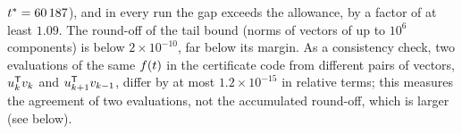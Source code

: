 $t^{*}=60\,187$), and in every run the gap exceeds the allowance, by a factor of at least $1.09$. The round-off of the
tail bound (norms of vectors of up to $10^{6}$ components) is below $2\times10^{-10}$, far below its margin. As a
consistency check, two evaluations of the same $f(t)$ in the certificate code from different pairs of vectors,
$u_k^{\mathsf{T}}v_k$ and $u_{k+1}^{\mathsf{T}}v_{k-1}$, differ by at most $1.2\times10^{-15}$ in relative terms; this measures the
agreement of two evaluations, not the accumulated round-off, which is larger (see below).

